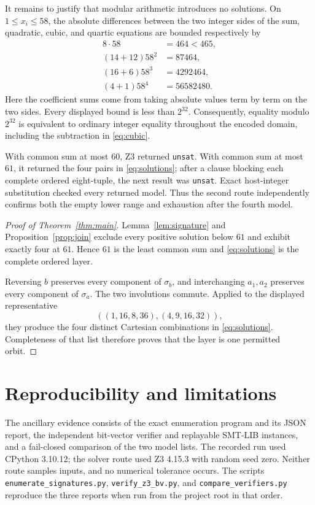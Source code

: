 \documentclass[11pt]{article}
\begin{document}
It remains to justify that modular arithmetic introduces no solutions.  On
$1\leq x_i\leq58$, the absolute differences between the two integer sides of
the sum, quadratic, cubic, and quartic equations are bounded respectively by
\[
 \begin{split}
  8\cdot58&=464<465,\\
  (14+12)58^2&=87464,\\
  (16+6)58^3&=4292464,\\
  (4+1)58^4&=56582480.
 \end{split}
\]
Here the coefficient sums come from taking absolute values term by term on
the two sides.  Every displayed bound is less than $2^{32}$.
Consequently, equality modulo $2^{32}$ is equivalent to ordinary integer
equality throughout the encoded domain, including the subtraction in
\eqref{eq:cubic}.

With common sum at most $60$, Z3 returned \texttt{unsat}.  With common sum at
most $61$, it returned the four pairs in \eqref{eq:solutions}; after a clause
blocking each complete ordered eight-tuple, the next result was
\texttt{unsat}.  Exact host-integer substitution checked every returned
model.  Thus the second route independently confirms both the empty lower
range and exhaustion after the fourth model.

\begin{proof}[Proof of Theorem~\ref{thm:main}]
Lemma~\ref{lem:signature} and Proposition~\ref{prop:join} exclude every
positive solution below $61$ and exhibit exactly four at $61$.  Hence $61$ is
the least common sum and \eqref{eq:solutions} is the complete ordered layer.

Reversing $b$ preserves every component of $\sigma_b$, and interchanging
$a_1,a_2$ preserves every component of $\sigma_a$.  The two involutions
commute.  Applied to the displayed representative
\[
 ((1,16,8,36),(4,9,16,32)),
\]
they produce the four distinct Cartesian combinations in
\eqref{eq:solutions}.  Completeness of that list therefore proves that the
layer is one permitted orbit.
\end{proof}

\section{Reproducibility and limitations}

The ancillary evidence consists of the exact enumeration program and its
JSON report, the independent bit-vector verifier and replayable SMT-LIB
instances, and a fail-closed comparison of the two model lists.  The recorded
run used CPython 3.10.12; the solver route used Z3 4.15.3 with random seed zero.
Neither route samples inputs, and no numerical tolerance occurs.  The scripts
\texttt{enumerate\_signatures.py}, \texttt{verify\_z3\_bv.py}, and
\texttt{compare\_verifiers.py} reproduce the three reports when run from the
project root in that order.
\end{document}
